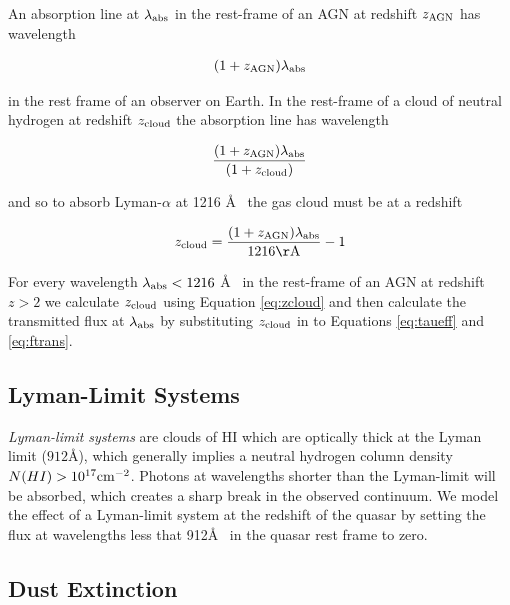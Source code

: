 An absorption line at $\lambda_{\rm abs}$ in the rest-frame of an AGN at redshift $z_{\rm AGN}$ has wavelength 

\begin{eqnarray}
  (1 + z_{\rm AGN})\lambda_{\rm abs} 
\end{eqnarray}

in the rest frame of an observer on Earth. In the rest-frame of a cloud of neutral hydrogen at redshift $z_{\rm cloud}$ the absorption line has wavelength 

\begin{eqnarray}
  \frac{ (1 + z_{\rm AGN}) \lambda_{\rm abs} } { (1 + z_{\rm cloud}) }
\end{eqnarray}

and so to absorb Lyman-$\alpha$ at 1216 \AA~ the gas cloud must be at a redshift

\begin{eqnarray}
  \label{eq:zcloud}
  z_{\rm cloud} = \frac{ (1 + z_{\rm AGN}) \lambda_{\rm abs} } { 1216{\rm \AA} } - 1
\end{eqnarray}

For every wavelength $\lambda_{\rm abs} < 1216$ \AA~ in the rest-frame of an AGN at redshift $z > 2$ we calculate $z_{\rm cloud}$ using Equation \ref{eq:zcloud} and then calculate the transmitted flux at $\lambda_{\rm abs}$ by substituting $z_{\rm cloud}$ in to Equations \ref{eq:taueff} and \ref{eq:ftrans}. 

\subsection{Lyman-Limit Systems}

{\it Lyman-limit systems} are clouds of HI which are optically thick at the Lyman limit ($912$\AA), which generally implies a neutral hydrogen column density $N(HI) > 10^{17} {\rm cm}^{-2}$. Photons at wavelengths shorter than the Lyman-limit will be absorbed, which creates a sharp break in the observed continuum. We model the effect of a Lyman-limit system at the redshift of the quasar by setting the flux at wavelengths less that 912\AA~ in the quasar rest frame to zero.   

\subsection{Dust Extinction} 

